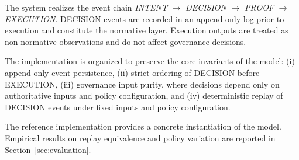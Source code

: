 The system realizes the event chain
\textit{INTENT} $\rightarrow$ \textit{DECISION} $\rightarrow$ \textit{PROOF}
$\rightarrow$ \textit{EXECUTION}. DECISION events are recorded in an
append-only log prior to execution and constitute the normative layer.
Execution outputs are treated as non-normative observations and do not affect
governance decisions.

The implementation is organized to preserve the core invariants of the model:
(i) append-only event persistence,
(ii) strict ordering of DECISION before EXECUTION,
(iii) governance input purity, where decisions depend only on authoritative
inputs and policy configuration, and
(iv) deterministic replay of DECISION events under fixed inputs and policy
configuration.

The reference implementation provides a concrete instantiation of the model.
Empirical results on replay equivalence and policy variation are reported in
Section~\ref{sec:evaluation}.
